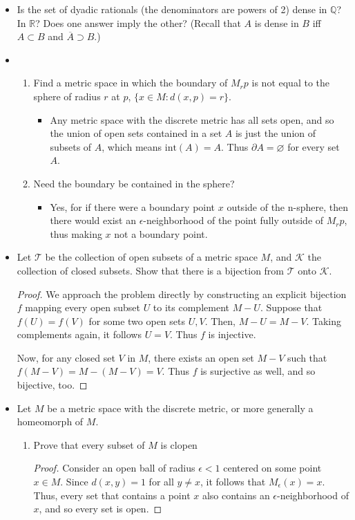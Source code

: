 \documentclass[11pt,a4paper]{article}
\newcommand{\pnum}[1]{\item[\textbf{#1}]}
\newcommand{\Q}{\mathbb{Q}}
\newcommand{\R}{\mathbb{R}}
\newcommand{\topo}{\mathcal{T}}
\newcommand{\cl}[1]{\overline{#1}}
\begin{document}
\begin{itemize}
	\pnum{\hl{2.9}} Is the set of dyadic rationals (the denominators are powers of 2) dense in $\Q$?
	In $\R$? Does one answer imply the other? (Recall that $A$ is dense in $B$ iff $A \subset B$ and
	$\cl{A} \supset B$.)

	\pnum{2.10}
	\begin{enumerate}[label=\alph*)]
		\item Find a metric space in which the boundary of $M_rp$ is not equal to the sphere of radius
		$r$ at $p$, $\{x\in M:d(x,p) = r\}$.
		\begin{itemize}
			\item[] Any metric space with the discrete metric has all sets open, and so the union of
			open sets contained in a set $A$ is just the union of subsets of $A$, which means
			$\text{int}(A)=A$. Thus $\partial A = \varnothing$ for every set $A$.
		\end{itemize}
		\item Need the boundary be contained in the sphere?
		\begin{itemize}
			\item[] Yes, for if there were a boundary point $x$ outside of the n-sphere, then there
			would exist an $\epsilon$-neighborhood of the point fully outside of $M_rp$, thus making
			$x$ not a boundary point.
		\end{itemize}
	\end{enumerate}

	\pnum{2.11} Let $\topo$ be the collection of open subsets of a metric space $M$, and $\mathcal{K}$
	the collection of closed subsets. Show that there is a bijection from $\topo$ onto $\mathcal{K}$.
	\begin{proof}
		We approach the problem directly by constructing an explicit bijection $f$
		mapping every open subset $U$ to its complement $M - U$. Suppose that $f(U) = f(V)$
		for some two open sets $U,V$. Then, $M - U = M - V$. Taking complements again,
		it follows $U = V$. Thus $f$ is injective.

		Now, for any closed set $V$ in $M$, there exists an open set $M - V$ such that
		$f(M-V) = M-(M-V) = V$. Thus $f$ is surjective as well, and so bijective, too.
	\end{proof}

	\pnum{2.12} Let $M$ be a metric space with the discrete metric, or more generally a
	homeomorph of $M$.

	\begin{enumerate}[label=\alph*)]
	\item Prove that every subset of $M$ is clopen
	\begin{proof}
		Consider an open ball of radius $\epsilon < 1$ centered on some point $x \in M$.
		Since $d(x,y) = 1$ for all $y\neq x$, it follows that $M_\epsilon(x) = x$.
			Thus, every set that contains a point $x$ also contains an $\epsilon$-neighborhood of $x$,
			and so every set is open.


\end{proof}
\end{enumerate}
\end{itemize}
\end{document}
